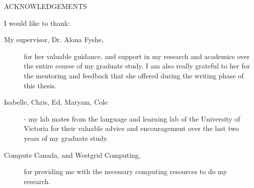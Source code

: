 \newpage
{}

\begin{center}
ACKNOWLEDGEMENTS
\end{center}

\noindent I would like to thank:
\begin{description}
\item[My supervisor, Dr. Alona Fyshe,]for her valuable guidance, and 
    support in my research and academics over the entire course of my graduate study.
    I am also really grateful to her
    for the mentoring and feedback that she offered during the writing phase
    of this thesis.
\item[Isabelle, Chris, Ed, Maryam, Cole]- my lab mates from the language and learning lab of the
    University of Victoria for their valuable advice and encouragement over the last two years of my graduate study.
\item[Compute Canada, and Westgrid Computing,]
    for providing me with the necessary computing resources to do my research.
\end{description}
